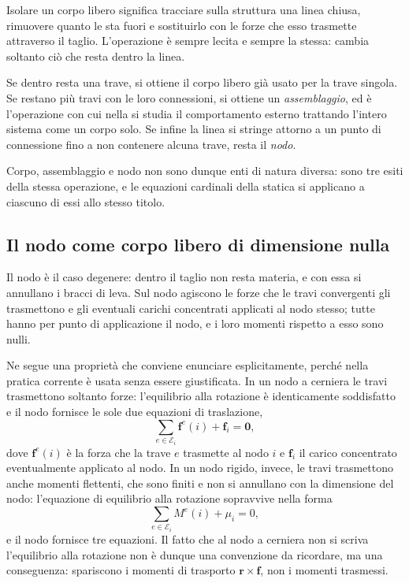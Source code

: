Isolare un corpo libero significa tracciare sulla struttura
una linea chiusa, rimuovere quanto le sta fuori e
sostituirlo con le forze che esso trasmette attraverso il
taglio. L'operazione è sempre lecita e sempre la stessa:
cambia soltanto ciò che resta dentro la linea.

Se dentro resta una trave, si ottiene il corpo libero già
usato per la trave singola. Se restano più travi con le loro
connessioni, si ottiene un \emph{assemblaggio}, ed è
l'operazione con cui nella  si
studia il comportamento esterno trattando l'intero sistema
come un corpo solo. Se infine la linea si stringe attorno a
un punto di connessione fino a non contenere alcuna trave,
resta il \emph{nodo}.

Corpo, assemblaggio e nodo non sono dunque enti di natura
diversa: sono tre esiti della stessa operazione, e le
equazioni cardinali della statica si applicano a ciascuno
di essi allo stesso titolo.


\subsection{Il nodo come corpo libero di dimensione nulla}
\label{subsec:nodo_corpo_libero}

Il nodo è il caso degenere: dentro il taglio non resta
materia, e con essa si annullano i bracci di leva. Sul nodo
agiscono le forze che le travi convergenti gli trasmettono
e gli eventuali carichi concentrati applicati al nodo
stesso; tutte hanno per punto di applicazione il nodo, e i
loro momenti rispetto a esso sono nulli.

Ne segue una proprietà che conviene enunciare
esplicitamente, perché nella pratica corrente è usata senza
essere giustificata. In un nodo a cerniera le travi
trasmettono soltanto forze: l'equilibrio alla rotazione è
identicamente soddisfatto e il nodo fornisce le sole due
equazioni di traslazione,
\begin{equation}\label{eq:equilibrio_nodo_cerniera}
	\sum_{e \in \mathcal{E}_i} \bm{f}^e(i) + \bm{f}_i
	= \bm{0},
\end{equation}
dove $\bm{f}^e(i)$ è la forza che la trave $e$ trasmette al
nodo $i$ e $\bm{f}_i$ il carico concentrato eventualmente
applicato al nodo. In un nodo rigido, invece, le travi
trasmettono anche momenti flettenti, che sono finiti e non
si annullano con la dimensione del nodo: l'equazione di
equilibrio alla rotazione sopravvive nella forma
\begin{equation}\label{eq:equilibrio_nodo_rigido}
	\sum_{e \in \mathcal{E}_i} M^e(i) + \mu_i = 0,
\end{equation}
e il nodo fornisce tre equazioni. Il fatto che al nodo a
cerniera non si scriva l'equilibrio alla rotazione non è
dunque una convenzione da ricordare, ma una conseguenza:
spariscono i momenti di trasporto $\bm{r} \times \bm{f}$,
non i momenti trasmessi.

